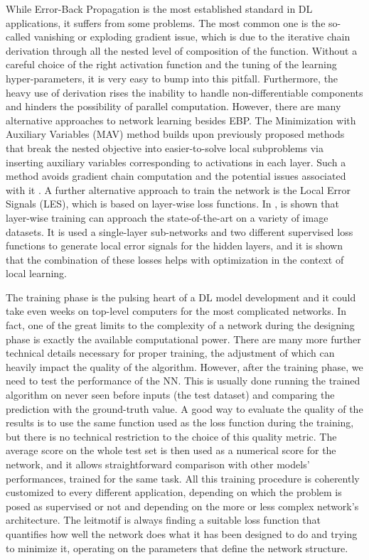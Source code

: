 While Error-Back Propagation is the most established standard in DL applications, it suffers from some problems. The most common one is the so-called vanishing or exploding gradient issue, which is due to the iterative chain derivation through all the nested level of composition of the function. Without a careful choice of the right activation function and the tuning of the learning hyper-parameters, it is very easy to bump into this pitfall. Furthermore, the heavy use of derivation rises the inability to handle non-differentiable components and hinders the possibility of parallel computation. However, there are many alternative approaches to network learning besides EBP. The Minimization with Auxiliary Variables (MAV) method builds upon previously proposed methods that break the nested objective into easier-to-solve local subproblems via inserting auxiliary variables corresponding to activations in each layer. Such a method avoids gradient chain computation and the potential issues associated with it \cite{1806.09077}. A further alternative approach to train the network is the Local Error Signals (LES), which is based on layer-wise loss functions. In \cite{1901.06656}, is shown that layer-wise training can approach the state-of-the-art on a variety of image datasets. It is used a single-layer sub-networks and two different supervised loss functions to generate local error signals for the hidden layers, and it is shown that the combination of these losses helps with optimization in the context of local learning.

The training phase is the pulsing heart of a DL model development and it could take even weeks on top-level computers for the most complicated networks. In fact, one of the great limits to the complexity of a network during the designing phase is exactly the available computational power. There are many more further technical details necessary for proper training, the adjustment of which can heavily impact the quality of the algorithm. However, after the training phase, we need to test the performance of the NN. This is usually done running the trained algorithm on never seen before inputs (the test dataset) and comparing the prediction with the ground-truth value. A good way to evaluate the quality of the results is to use the same function used as the loss function during the training, but there is no technical restriction to the choice of this quality metric. The average score on the whole test set is then used as a numerical score for the network, and it allows straightforward comparison with other models' performances, trained for the same task. All this training procedure is coherently customized to every different application, depending on which the problem is posed as supervised or not and depending on the more or less complex network's architecture. The leitmotif is always finding a suitable loss function that quantifies how well the network does what it has been designed to do and trying to minimize it, operating on the parameters that define the network structure.
